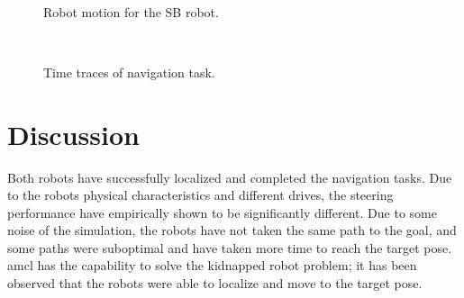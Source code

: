 \documentclass[10pt,journal,compsoc]{IEEEtran}
\begin{document}
\begin{figure}
{        \label{fig:sb4}
    }
    \\
    \caption{Robot motion for the SB robot.}
    \label{fig:sb_motion}
\end{figure}

\begin{figure}
\centering
    \\
    \caption{Time traces of navigation task.}
    \label{fig:time_nav}
\end{figure}



\section{Discussion}

Both robots have successfully localized and completed the navigation tasks. Due to the robots physical characteristics and different drives, the steering performance have empirically shown to be significantly different.  Due to some noise of the simulation, the robots have not taken the same path to the goal, and some paths were suboptimal and have taken more time to reach the target pose. amcl has the capability to solve the kidnapped robot problem; it has been observed that the robots were able to localize and move to the target pose.   
\end{document}
